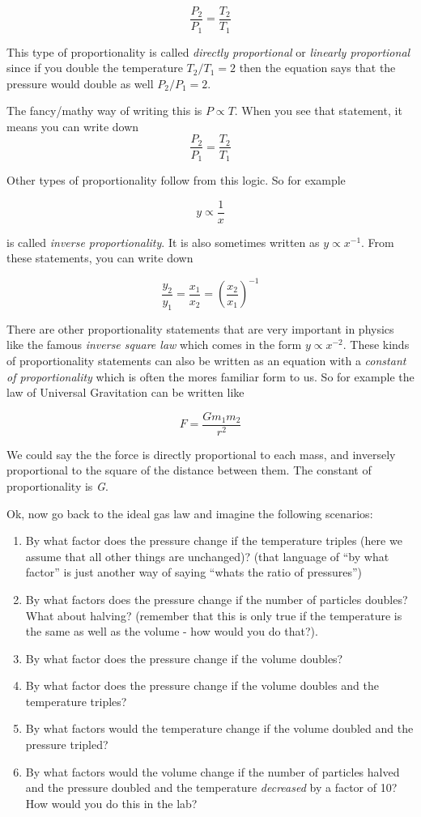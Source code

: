 \[\frac{P_2}{P_1} = \frac{T_2}{T_1}\]

This type of proportionality is called \emph{directly proportional} or
\emph{linearly proportional} since if you double the temperature
\(T_2/T_1 = 2\) then the equation says that the pressure would double as
well \(P_2/P_1 = 2\).

The fancy/mathy way of writing this is \(P \propto T\). When you see
that statement, it means you can write down
\[\frac{P_2}{P_1} = \frac{T_2}{T_1}\]

Other types of proportionality follow from this logic. So for example

\[ y \propto \frac{1}{x} \]

is called \emph{inverse proportionality}. It is also sometimes written
as \(y \propto x^{-1}\). From these statements, you can write down

\[ \frac{y_2}{y_1} = \frac{x_1}{x_2} = \left(\frac{x_2}{x_1}\right)^{-1} \]

There are other proportionality statements that are very important in
physics like the famous \emph{inverse square law} which comes in the
form \(y \propto x^{-2}\). These kinds of proportionality statements can
also be written as an equation with a \emph{constant of proportionality}
which is often the mores familiar form to us. So for example the law of
Universal Gravitation can be written like

\[ F = \frac{G m_1 m_2}{r^2} \]

We could say the the force is directly proportional to each mass, and
inversely proportional to the square of the distance between them. The
constant of proportionality is \emph{G}.

Ok, now go back to the ideal gas law and imagine the following
scenarios:

\begin{enumerate}
\def\labelenumi{\arabic{enumi}.}
\tightlist
\item
  By what factor does the pressure change if the temperature triples
  (here we assume that all other things are unchanged)? (that language
  of ``by what factor'' is just another way of saying ``whats the ratio
  of pressures'')
\item
  By what factors does the pressure change if the number of particles
  doubles? What about halving? (remember that this is only true if the
  temperature is the same as well as the volume - how would you do
  that?).
\item
  By what factor does the pressure change if the volume doubles?
\item
  By what factor does the pressure change if the volume doubles and the
  temperature triples?
\item
  By what factors would the temperature change if the volume doubled and
  the pressure tripled?
\item
  By what factors would the volume change if the number of particles
  halved and the pressure doubled and the temperature \emph{decreased}
  by a factor of 10? How would you do this in the lab?
\end{enumerate}
